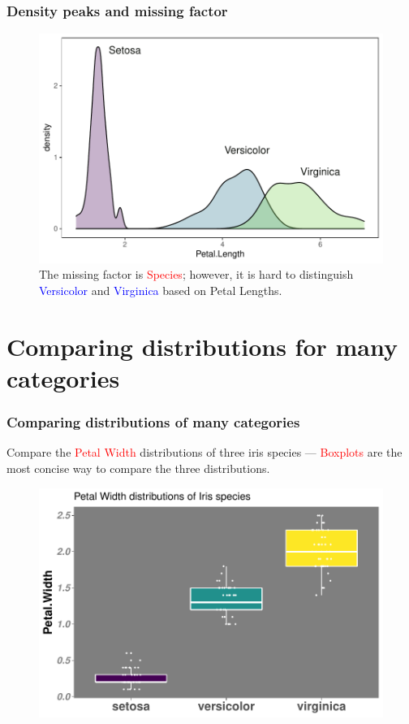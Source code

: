 \documentclass{beamer}
\begin{document}
\begin{frame}\frametitle{Density peaks and missing factor}
\begin{figure}
\includegraphics[width=0.99\linewidth]{PlotsLec1/KDEPetalLength2}
\caption{{\small The missing factor is \textcolor{red}{Species}; however, it is hard to distinguish \textcolor{blue}{Versicolor} and \textcolor{blue}{Virginica} based on Petal Lengths}.}
\end{figure}
\end{frame}


\section{Comparing distributions for many categories}
\begin{frame}\frametitle{Comparing distributions of many categories}
Compare the \textcolor{red}{Petal Width} distributions of three iris species --- \textcolor{red}{Boxplots} are the most concise way to compare the three distributions.
\begin{figure}
\includegraphics[width=0.90\linewidth]{PlotsLec1/PetalWidthBox}
\end{figure}
\end{frame}
\end{document}

